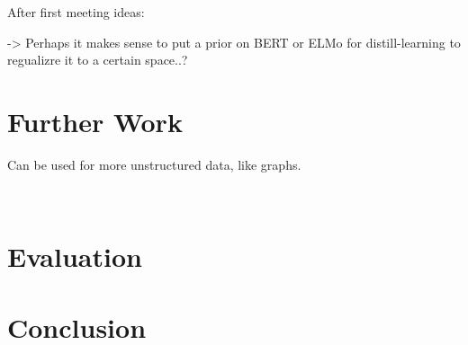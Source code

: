 \documentclass[a4paper,12pt,twoside,openright]{report}
\begin{document}
After first meeting ideas:

-> Perhaps it makes sense to put a prior on BERT or ELMo for distill-learning to regualizre it to a certain space..?

\chapter{Further Work}

Can be used for more unstructured data, like graphs.

\
\chapter{Evaluation}

\chapter{Conclusion}

\appendix
\singlespacing

 
 
\end{document}
